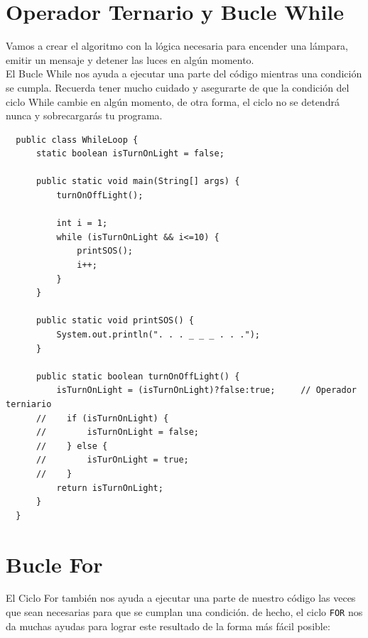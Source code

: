\documentclass{article}
\begin{document}
\section{Operador Ternario y Bucle While}%
Vamos a crear el algoritmo con la lógica necesaria para encender una lámpara,
emitir un mensaje y detener las luces en algún momento.\\

El Bucle While nos ayuda a ejecutar una parte del código mientras una condición
se cumpla. Recuerda tener mucho cuidado y asegurarte de que la condición del
ciclo While cambie en algún momento, de otra forma, el ciclo no se detendrá
nunca y sobrecargarás tu programa.

\begin{verbatim}
  public class WhileLoop {
      static boolean isTurnOnLight = false;

      public static void main(String[] args) {
          turnOnOffLight();

          int i = 1;
          while (isTurnOnLight && i<=10) {
              printSOS();
              i++;
          }
      }

      public static void printSOS() {
          System.out.println(". . . _ _ _ . . .");
      }

      public static boolean turnOnOffLight() {
          isTurnOnLight = (isTurnOnLight)?false:true;     // Operador terniario
      //    if (isTurnOnLight) {
      //        isTurnOnLight = false;
      //    } else {
      //        isTurOnLight = true;
      //    }
          return isTurnOnLight;
      }
  }
\end{verbatim}

\section{Bucle For}%
El Ciclo For también nos ayuda a ejecutar una parte de nuestro código las veces
que sean necesarias para que se cumplan una condición. de hecho, el ciclo
\texttt{FOR} nos da muchas ayudas para lograr este resultado de la forma más
fácil posible:\\
\end{document}
